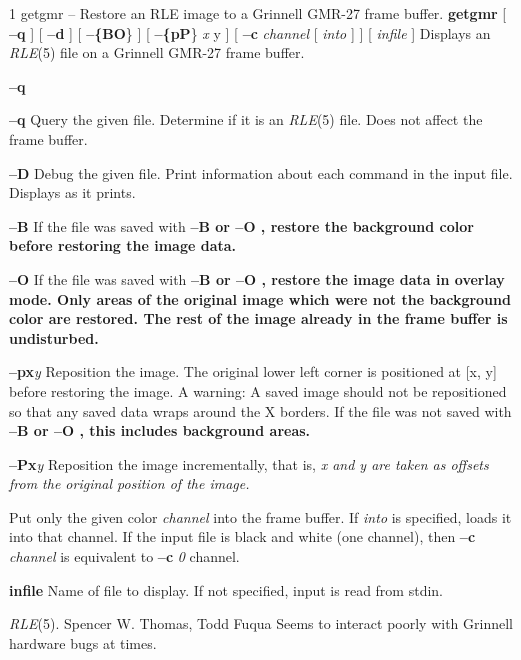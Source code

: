 %
%
%
 1
getgmr -- Restore an RLE image to a Grinnell GMR-27 frame buffer.
{\bf getgmr}
[
{\bf --q}
] [
{\bf --d}
] [
{\bf --\{BO}\}
] [
{\bf --\{pP}\}
{\it x} y
] [
{\bf --c}
{\it channel}
[
{\it into}
] ] [ 
{\it infile}
]
Displays an
{\it RLE}{\rm (5)}
file on a Grinnell GMR-27 frame buffer.
\begin{TPlist}{{\bf --q}}
\item[{{\bf --q}}]
Query the given file.  Determine if it is an
{\it RLE}{\rm (5)}
file.  Does not affect the frame buffer.
\item[{{\bf --D}}]
Debug the given file.  Print information about each command in the input
file.  Displays as it prints.
\item[{{\bf --B}}]
If the file was saved with %
\bf --B \rm%
or %
\bf --O\rm%
, restore the
background color before restoring the image data.
\item[{{\bf --O}}]
If the file was saved with %
\bf --B \rm%
or %
\bf --O\rm%
, restore the image
data in overlay mode. Only areas of the original image which were not
the background color are restored.  The rest of the image already in
the frame buffer is undisturbed.
\item[{{\bf --p}{\it }{\bf x}{\it y}
}]
Reposition the image.  The original lower left corner is positioned at [x, y]
before restoring the image.  A warning:  A saved image should not be
repositioned so that any saved data wraps around the X borders.  If the file
was not saved with %
\bf --B \rm%
or %
\bf --O\rm%
, this includes background areas.
\item[{{\bf --P}{\it }{\bf x}{\it y}
}]
Reposition the image incrementally, that is, %
\it x \rm%
and %
\it y \rm%
are
taken as offsets from the original position of the image.
\item[{%
\bf --c \rm%
%
\it channel \rm%
[ %
\it into \rm%
]}]
Put only the given color
{\it channel}
into the frame buffer.  If
{\it into}
is specified, loads it into that channel.
If the input file is black and
white (one channel), then
{\bf --c}
{\it channel}
is equivalent to
{\bf --c}
{\it 0} channel.
\item[{{\bf infile}}]
Name of file to display.  If not specified, input is read from stdin.
\end{TPlist}
{\it RLE}{\rm (5).}
Spencer W. Thomas, 
Todd Fuqua
Seems to interact poorly with Grinnell hardware bugs at times.
\newpage


